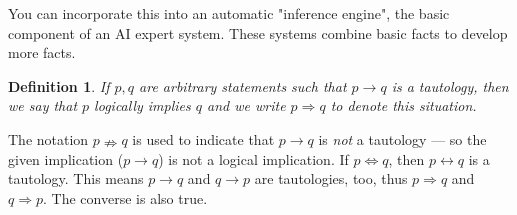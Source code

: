 \documentclass[12pt]{article}
\newtheorem{definition}{Definition} [section]
\begin{document}
You can incorporate this into an automatic "inference engine", the basic component of an AI expert system. These systems combine basic facts to develop more facts.
\begin{definition}
\emph{If $p, q$ are arbitrary statements such that $p \rightarrow q$ is a tautology, then we say that $p$} logically implies \emph{$q$ and we write $p \Rightarrow q$ to denote this situation.}
\end{definition}
The notation $p \nRightarrow q$ is used to indicate that $p \rightarrow q$ is \emph{not} a tautology --- so the given implication ($p \rightarrow q$) is not a logical implication.
If $p \Leftrightarrow q$, then $p \leftrightarrow q$ is a tautology. This means $p \rightarrow q$ and $q \rightarrow p$ are tautologies, too, thus $p \Rightarrow q$ and $q \Rightarrow p$. The converse is also true.
\end{document}
